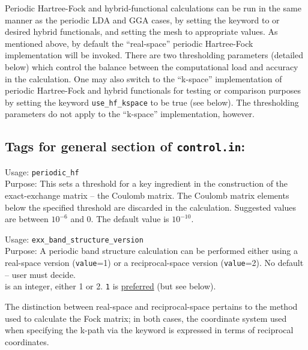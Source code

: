 Periodic Hartree-Fock and hybrid-functional calculations can be run
in the same manner as the periodic LDA and GGA cases, by setting the keyword 
 to  or desired hybrid functionals, and setting the 
 mesh to appropriate values. As mentioned above, by default
the ``real-space'' periodic Hartree-Fock implementation will be invoked. There are two
thresholding parameters (detailed below) which control the balance between the 
computational load and accuracy in the calculation.  One may also switch to the 
``k-space'' implementation of periodic Hartree-Fock and hybrid functionals for testing or 
comparison purposes by setting the keyword \texttt{use\_hf\_kspace} to be true 
(see below).  The thresholding parameters do not apply to the ``k-space'' implementation,
however.

\newpage

\subsection*{Tags for general section of \texttt{control.in}:}

{ \noindent
  Usage: \texttt{periodic\_hf}   \\[1.0ex]
  Purpose: This sets a threshold  for a key ingredient in the construction
  of the exact-exchange matrix -- the Coulomb matrix. 
  The Coulomb matrix elements below the specified threshold
   are discarded in the calculation. Suggested values
  are between $10^{-6}$ and 0. The default value is $10^{-10}$.
}

{ \noindent
  Usage: \texttt{exx\_band\_structure\_version} 
  \\[1.0ex]
  Purpose: A periodic band structure calculation can be performed
    either using a real-space version (\texttt{value}=1) or a
    reciprocal-space version (\texttt{value}=2).  No default -- user 
    must decide.  \\[1.0ex]
   is an integer, either 1 or 2. 
    \texttt{1} is \underline{preferred} (but see below).\\
}

The distinction between real-space and reciprocal-space pertains to the method used to 
calculate the Fock matrix; in both cases, the coordinate system used when specifying the 
k-path via the   keyword is expressed in terms 
of reciprocal coordinates.


